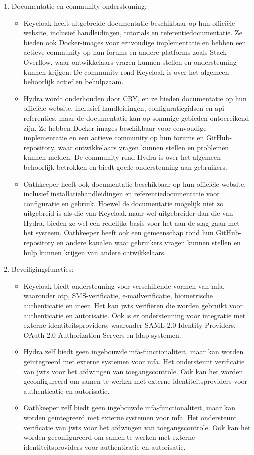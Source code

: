 \begin{enumerate}
  \item Documentatie en community ondersteuning:
  \begin{itemize}
    \item Keycloak heeft uitgebreide documentatie beschikbaar op hun officiële website, inclusief handleidingen, tutorials en referentiedocumentatie. Ze bieden ook Docker-images voor eenvoudige implementatie en hebben een actieve community op hun forums en andere platforms zoals Stack Overflow, waar ontwikkelaars vragen kunnen stellen en ondersteuning kunnen krijgen. De community rond Keycloak is over het algemeen behoorlijk actief en behulpzaam.
    \item Hydra wordt onderhouden door ORY, en ze bieden documentatie op hun officiële website, inclusief handleidingen, configuratiegidsen en \gls{api}-referenties, maar de documentatie kan op sommige gebieden ontoereikend zijn. Ze hebben Docker-images beschikbaar voor eenvoudige implementatie en een actieve community op hun forums en GitHub-repository, waar ontwikkelaars vragen kunnen stellen en problemen kunnen melden. De community rond Hydra is over het algemeen behoorlijk betrokken en biedt goede ondersteuning aan gebruikers.
    \item Oathkeeper heeft ook documentatie beschikbaar op hun officiële website, inclusief installatiehandleidingen en referentiedocumentatie voor configuratie en gebruik. Hoewel de documentatie mogelijk niet zo uitgebreid is als die van Keycloak maar wel uitgebreider dan die van Hydra, bieden ze wel een redelijke basis voor het aan de slag gaan met het systeem. Oathkeeper heeft ook een gemeenschap rond hun GitHub-repository en andere kanalen waar gebruikers vragen kunnen stellen en hulp kunnen krijgen van andere ontwikkelaars.
  \end{itemize}
  
  \item Beveiligingsfuncties:
  \begin{itemize}
    \item Keycloak biedt ondersteuning voor verschillende vormen van \gls{mfa}, waaronder \gls{otp}, SMS-verificatie, e-mailverificatie, biometrische authenticatie en meer. Het kan \gls{jwts} verifiëren die worden gebruikt voor authenticatie en autorisatie. Ook is er ondersteuning voor integratie met externe identiteitsproviders, waaronder SAML 2.0 Identity Providers, OAuth 2.0 Authorization Servers en \gls{ldap}-systemen.
    \item Hydra zelf biedt geen ingebouwde \gls{mfa}-functionaliteit, maar kan worden geïntegreerd met externe systemen voor \gls{mfa}. Het ondersteunt verificatie van \gls{jwts} voor het afdwingen van toegangscontrole. Ook kan het worden geconfigureerd om samen te werken met externe identiteitsproviders voor authenticatie en autorisatie.
    \item Oathkeeper zelf biedt geen ingebouwde \gls{mfa}-functionaliteit, maar kan worden geïntegreerd met externe systemen voor \gls{mfa}. Het ondersteunt verificatie van \gls{jwts} voor het afdwingen van toegangscontrole. Ook kan het worden geconfigureerd om samen te werken met externe identiteitsproviders voor authenticatie en autorisatie.
  \end{itemize}
  

\end{enumerate}
